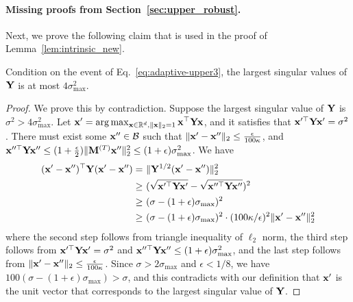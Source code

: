 \paragraph{Missing proofs from Section~\ref{sec:upper_robust}.}
Next, we prove the following claim that is used in the proof of Lemma~\ref{lem:intrinsic_new}.
\begin{claim}
\label{claim:upper-tech1}
Condition on the event of Eq.~\eqref{eq:adaptive-upper3}, the largest singular values of $\mathbf{Y}$ is at most $4 \sigma_{\max}^2$.
\end{claim}
\begin{proof}
We prove this by contradiction. Suppose the largest singular value of $\mathbf{Y}$ is $\sigma^2 > 4 \sigma_{\max}^2$. Let $\mathbf{x}' = \arg\max_{\mathbf{x} \in \mathbb{R}^d, \|\mathbf{x}\|_2 = 1} \mathbf{x}^{\top} \mathbf{Y} \mathbf{x}$, and it satisfies that $\mathbf{x}'^{\top} \mathbf{Y} \mathbf{x}' = \sigma^2$. There must exist some $\mathbf{x}'' \in \mathcal{B}$ such that $\|\mathbf{x}' - \mathbf{x}''\|_2 \leq \frac{\epsilon}{100 \kappa}$, and $\mathbf{x}''^{\top} \mathbf{Y} \mathbf{x}'' \leq (1 + \frac{\epsilon}{2}) \|\mathbf{M}^{(T)} \mathbf{x}''\|_2^2 \leq (1 + \epsilon) \sigma_{\max}^2$. We have
\begin{align*}
(\mathbf{x}' - \mathbf{x}'')^{\top} \mathbf{Y} (\mathbf{x}' - \mathbf{x}'') = &~ \|\mathbf{Y}^{1/2} (\mathbf{x}' - \mathbf{x}'')\|_2^2 \\
\geq &~ (\sqrt{\mathbf{x}'^{\top} \mathbf{Y} \mathbf{x}'} - \sqrt{\mathbf{x}''^{\top} \mathbf{Y} \mathbf{x}''})^2 \\
\geq &~ (\sigma - (1 + \epsilon) \sigma_{\max})^2 \\
\geq &~ (\sigma - (1 + \epsilon) \sigma_{\max})^2 \cdot (100 \kappa / \epsilon)^2 \|\mathbf{x}' - \mathbf{x}''\|_2^2
\end{align*}
where the second step follows from triangle inequality of $\ell_2$ norm, the third step follows from $\mathbf{x}'^{\top} \mathbf{Y} \mathbf{x}' = \sigma^2$ and $\mathbf{x}''^{\top} \mathbf{Y} \mathbf{x}'' \leq (1 + \epsilon) \sigma_{\max}^2$, and the last step follows from $\|\mathbf{x}' - \mathbf{x}''\|_2 \leq \frac{\epsilon}{100 \kappa}$. Since $\sigma > 2 \sigma_{\max}$ and $\epsilon < 1/8$, we have $100 (\sigma - (1 + \epsilon) \sigma_{\max}) > \sigma$, and this contradicts with our definition that $\mathbf{x}'$ is the unit vector that corresponds to the largest singular value of $\mathbf{Y}$.
\end{proof}


